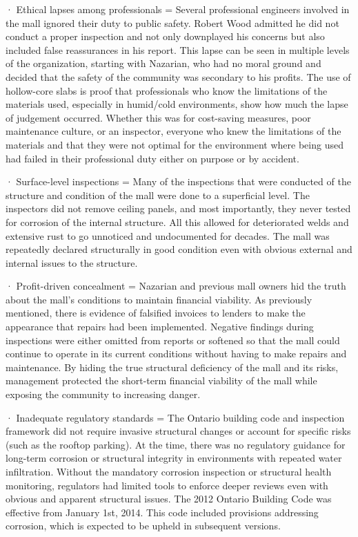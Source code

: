 \documentclass[12pt]{article}
\begin{document}
 

 · Ethical lapses among professionals = Several professional engineers involved in the mall ignored their duty to public safety. Robert Wood admitted he did not conduct a proper inspection and not only downplayed his concerns but also included false reassurances in his report. This lapse can be seen in multiple levels of the organization, starting with Nazarian, who had no moral ground and decided that the safety of the community was secondary to his profits. The use of hollow-core slabs is proof that professionals who know the limitations of the materials used, especially in humid/cold environments, show how much the lapse of judgement occurred. Whether this was for cost-saving measures, poor maintenance culture, or an inspector, everyone who knew the limitations of the materials and that they were not optimal for the environment where being used had failed in their professional duty either on purpose or by accident.

 

 · Surface-level inspections = Many of the inspections that were conducted of the structure and condition of the mall were done to a superficial level. The inspectors did not remove ceiling panels, and most importantly, they never tested for corrosion of the internal structure. All this allowed for deteriorated welds and extensive rust to go unnoticed and undocumented for decades. The mall was repeatedly declared structurally in good condition even with obvious external and internal issues to the structure.

 

 

 


 · Profit-driven concealment = Nazarian and previous mall owners hid the truth about the mall's conditions to maintain financial viability. As previously mentioned, there is evidence of falsified invoices to lenders to make the appearance that repairs had been implemented. Negative findings during inspections were either omitted from reports or softened so that the mall could continue to operate in its current conditions without having to make repairs and maintenance. By hiding the true structural deficiency of the mall and its risks, management protected the short-term financial viability of the mall while exposing the community to increasing danger.

 

 · Inadequate regulatory standards = The Ontario building code and inspection framework did not require invasive structural changes or account for specific risks (such as the rooftop parking). At the time, there was no regulatory guidance for long-term corrosion or structural integrity in environments with repeated water infiltration. Without the mandatory corrosion inspection or structural health monitoring, regulators had limited tools to enforce deeper reviews even with obvious and apparent structural issues. The 2012 Ontario Building Code was effective from January 1st, 2014. This code included provisions addressing corrosion, which is expected to be upheld in subsequent versions. 
\end{document}
